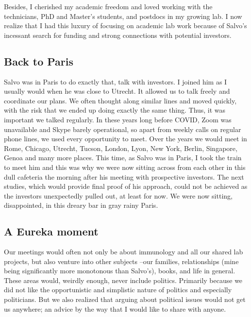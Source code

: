\documentclass[authordate, editorial, issue]{jote-new-article}
\begin{document}
	Besides, I cherished my academic freedom and loved working with the technicians, PhD and Master's students, and postdocs in my growing lab. I now realize that I had this luxury of focusing on academic lab work because of Salvo's incessant search for funding and strong connections with potential investors.







	\subsection{Back to Paris}



	Salvo was in Paris to do exactly that, talk with investors. I joined him as I usually would when he was close to Utrecht. It allowed us to talk freely and coordinate our plans. We often thought along similar lines and moved quickly, with the risk that we ended up doing exactly the same thing. Thus, it was important we talked regularly. In these years long before COVID, Zoom was unavailable and Skype barely operational, so apart from weekly calls on regular phone lines, we used every opportunity to meet. Over the years we would meet in Rome, Chicago, Utrecht, Tucson, London, Lyon, New York, Berlin, Singapore, Genoa and many more places. This time, as Salvo was in Paris, I took the train to meet him and this was why we were now sitting across from each other in this dull cafeteria the morning after his meeting with prospective investors. The next studies, which would provide final proof of his approach, could not be achieved as the investors unexpectedly pulled out, at least for now. We were now sitting, disappointed, in this dreary bar in gray rainy Paris.



	\subsection{A Eureka moment}



	Our meetings would often not only be about immunology and all our shared lab projects, but also venture into other subjects --our families, relationships (mine being significantly more monotonous than Salvo's), books, and life in general. These areas would, weirdly enough, never include politics. Primarily because we did not like the opportunistic and simplistic nature of politics and especially politicians. But we also realized that arguing about political issues would not get us anywhere; an advice by the way that I would like to share with anyone.
\end{document}
